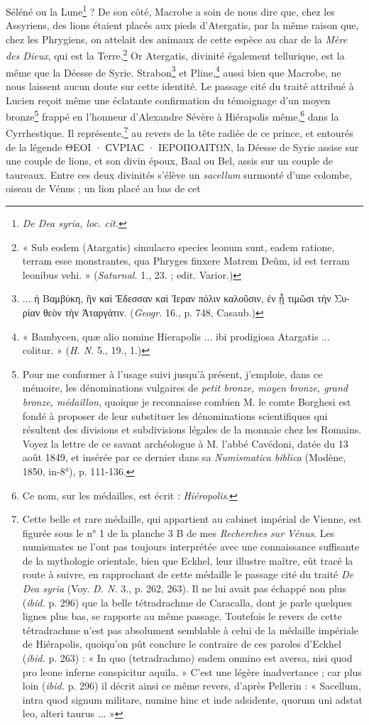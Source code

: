 \documentclass{article}
\begin{document}
Séléné ou la Lune\footnote{\emph{De Dea syria, loc. cit.}} ? De son côté, Macrobe a soin de nous dire que, chez les Assyriens, des lions étaient placés aux pieds d'Atergatis, par la même raison que, chez les Phrygiens, on attelait des animaux de cette espèce au char de la \emph{Mère des Dieux}, qui est la Terre.\footnote{« Sub eodem (Atargatis) simulacro species leonum sunt, eadem ratione, terram esse monstrantes, qua Phryges finxere Matrem Deûm, id est terram leonibus vehi. » (\emph{Saturnal.} 1., 23. ; edit. Varior.)} Or Atergatis, divinité également tellurique, est la même que la Déesse de Syrie. Strabon\footnote{... \textgreek{ἡ Βαμβύκη, ἣν καὶ Ἐδεσσαν καὶ Ἱεραν πόλιν καλοῦσιν, ἐν ᾗ τιμῶσι τὴν Συρίαν θεὸν τὴν Ἀταργάτιν}. (\emph{Geogr.} 16., p. 748, Casaub.)} et Pline,\footnote{« Bambycen, quæ alio nomine Hierapolis ... ibi prodigiosa Atargatis ... colitur. » (\emph{H. N.} 5., 19., 1.)} aussi bien que Macrobe, ne nous laissent aucun doute sur cette identité. Le passage cité du traité attribué à Lucien reçoit même une éclatante confirmation du témoignage d'un moyen bronze\footnote{Pour me conformer à l'usage suivi jusqu'à présent, j'emploie, dans ce mémoire, les dénominations vulgaires de \emph{petit bronze, moyen bronze, grand bronze, médaillon}, quoique je reconnaisse combien M. le comte Borghesi est fondé à proposer de leur substituer les dénominations scientifiques qui résultent des divisions et subdivisions légales de la monnaie chez les Romains. Voyez la lettre de ce savant archéologue à M. l'abbé Cavédoni, datée du 13 août 1849, et insérée par ce dernier dans sa \emph{Numismatica biblica} (Modène, 1850, in-8°), p. 111-136.} frappé en l'honneur d'Alexandre Sévère à Hiérapolis même,\footnote{Ce nom, sur les médailles, est écrit : \emph{Hiéropolis}.} dans la Cyrrhestique. Il représente,\footnote{Cette belle et rare médaille, qui appartient au cabinet impérial de Vienne, est figurée sous le n° 1 de la planche 3 B de mes \emph{Recherches sur Vénus}. Les numismates ne l'ont pas toujours interprétée avec une connaissance suffisante de la mythologie orientale, bien que Eckhel, leur illustre maître, eût tracé la route à suivre, en rapprochant de cette médaille le passage cité du traité \emph{De Dea syria} (Voy. \emph{D. N.} 3., p. 262, 263). Il ne lui avait pas échappé non plus (\emph{ibid.} p. 296) que la belle tétradrachme de Caracalla, dont je parle quelques lignes plus bas, se rapporte au même passage. Toutefois le revers de cette tétradrachme n'est pas absolument semblable à celui de la médaille impériale de Hiérapolis, quoiqu'on pût conclure le contraire de ces paroles d'Eckhel (\emph{ibid.} p. 263) : « In quo (tetradrachmo) eadem omnino est aversa, nisi quod pro leone inferne conspicitur aquila. » C'est une légère inadvertance ; car plus loin (\emph{ibid.} p. 296) il décrit ainsi ce même revers, d'après Pellerin : « Sacellum, intra quod signum militare, numine hinc et inde adsidente, quorum uni adstat leo, alteri taurus ... »} au revers de la tête radiée de ce prince, et entourés de la légende \textgreek{ΘΕΟΙ · ϹVΡΙΑϹ · ΙΕΡΟΠΟΛΙΤΩΝ}, la Déesse de Syrie assise sur une couple de lions, et son divin époux, Baal ou Bel, assis sur un couple de taureaux. Entre ces deux divinités s'élève un \emph{sacellum} surmonté d'une colombe, oiseau de Vénus ; un lion placé au bas de cet 
\end{document}
